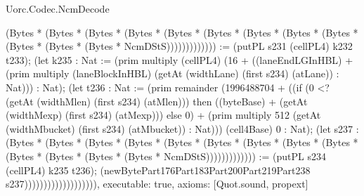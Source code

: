 \begin{lexlean}{Uorc.Codec.NcmDecode}
\begin{semanticmodule}
{(Bytes * (Bytes * (Bytes * (Bytes * (Bytes * (Bytes * (Bytes * (Bytes * (Bytes * (Bytes * (Bytes * (Bytes * NcmDStS))))))))))))) := (putPL s231 (cellPL4) k232 t233); (let k235 : Nat := (prim multiply (cellPL4) (16 + ((laneEndLGInHBL) + (prim multiply (laneBlockInHBL) (getAt (widthLane) (first s234) (atLane)) : Nat))) : Nat); (let t236 : Nat := (prim remainder (1996488704 + ((if (0 <? (getAt (widthMlen) (first s234) (atMlen))) then ((byteBase) + (getAt (widthMexp) (first s234) (atMexp))) else 0) + (prim multiply 512 (getAt (widthMbucket) (first s234) (atMbucket)) : Nat))) (cell4Base) 0 : Nat); (let s237 : (Bytes * (Bytes * (Bytes * (Bytes * (Bytes * (Bytes * (Bytes * (Bytes * (Bytes * (Bytes * (Bytes * (Bytes * (Bytes * NcmDStS))))))))))))) := (putPL s234 (cellPL4) k235 t236); (newBytePart176Part183Part200Part219Part238 s237))))))))))))))))))),
  executable: true,
  axioms: [Quot.sound, propext]
}


\end{semanticmodule}
\end{lexlean}
